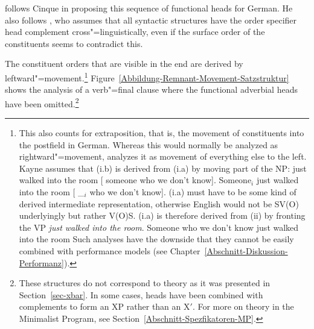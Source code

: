 \citet{Laenzlinger2004a} follows Cinque in proposing this sequence of functional heads for German. He also follows \citet{Kayne94a-u}, who assumes
that all syntactic structures have the order specifier head complement cross"=linguistically, even if the surface order of the constituents
seems to contradict this.%

The constituent orders that are visible in the end are derived by leftward"=movement.\footnote{\label{fn-Kayne-Extraposition}%
	This also counts for extraposition, that is, the movement of constituents into the postfield
	in German. Whereas this would normally be analyzed as rightward"=movement, \citet[Chapter~9]{Kayne94a-u} analyzes
	it as movement of everything else to the left. Kayne assumes that (i.b) is derived from (i.a) by moving part of the 
	NP:
\eal
\ex just walked into the room [ someone who we don't know].
\ex Someone$_i$ just walked into the room [ \_$_i$ who we don't know].
\zl
(i.a) must have to be some kind of derived intermediate representation, otherwise English would not be SV(O) underlyingly but rather V(O)S.
(i.a) is therefore derived from (ii) by fronting the VP \emph{just walked into the room}.
\ea
Someone who we don't know just walked into the room
\z
Such analyses have the downside that they cannot be easily combined with performance models (see Chapter~\ref{Abschnitt-Diskussion-Performanz}).%
} 
Figure~\vref{Abbildung-Remnant-Movement-Satzstruktur} shows the analysis of a verb"=final clause where the functional adverbial heads have been
omitted.\footnote{%
	These structures do not correspond to \xbar theory as it was presented in Section~\ref{sec-xbar}. In some cases, heads have been combined
	with complements to form an XP rather than an X$'$. For more on \xbar theory in the Minimalist Program, 
	see Section~\ref{Abschnitt-Spezfikatoren-MP}.
}
